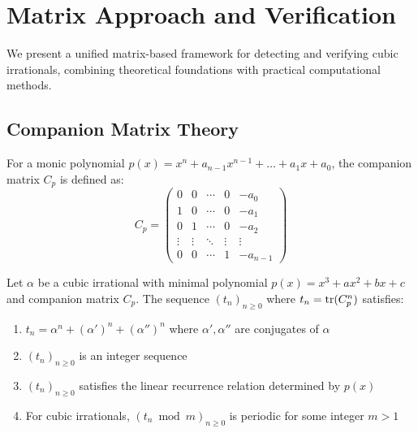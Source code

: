 \section{Matrix Approach and Verification}\label{sec:matrix_approach}

We present a unified matrix-based framework for detecting and verifying cubic irrationals, combining theoretical foundations with practical computational methods.

\subsection{Companion Matrix Theory}

\begin{definition}\label{def:companion_matrix}
For a monic polynomial $p(x) = x^n + a_{n-1}x^{n-1} + \ldots + a_1x + a_0$, the companion matrix $C_p$ is defined as:
\begin{equation}
C_p = \begin{pmatrix}
0 & 0 & \cdots & 0 & -a_0 \\
1 & 0 & \cdots & 0 & -a_1 \\
0 & 1 & \cdots & 0 & -a_2 \\
\vdots & \vdots & \ddots & \vdots & \vdots \\
0 & 0 & \cdots & 1 & -a_{n-1}
\end{pmatrix}
\end{equation}
\end{definition}

\begin{theorem}\label{thm:trace_properties}
Let $\alpha$ be a cubic irrational with minimal polynomial $p(x) = x^3 + ax^2 + bx + c$ and companion matrix $C_p$. The sequence $(t_n)_{n \geq 0}$ where $t_n = \operatorname{tr}(C_p^n)$ satisfies:
\begin{enumerate}
    \item $t_n = \alpha^n + (\alpha')^n + (\alpha'')^n$ where $\alpha', \alpha''$ are conjugates of $\alpha$
    \item $(t_n)_{n \geq 0}$ is an integer sequence
    \item $(t_n)_{n \geq 0}$ satisfies the linear recurrence relation determined by $p(x)$
    \item For cubic irrationals, $(t_n \bmod m)_{n \geq 0}$ is periodic for some integer $m > 1$
\end{enumerate}
\end{theorem}

